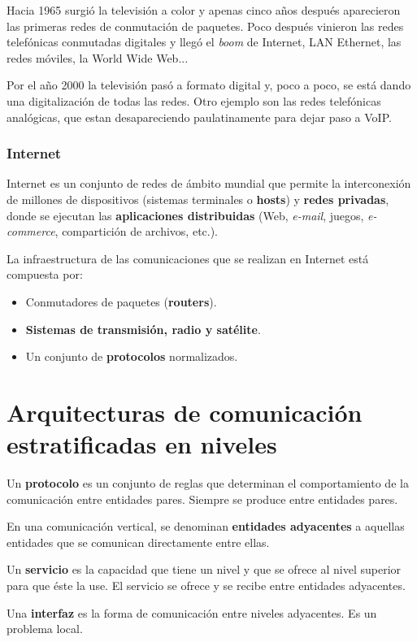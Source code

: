 \documentclass[a4paper]{book}
\begin{document}
Hacia 1965 surgió la televisión a color y apenas cinco años después aparecieron las primeras redes de conmutación de paquetes. Poco después vinieron las redes telefónicas conmutadas digitales y llegó el \textsl{boom} de Internet, LAN Ethernet, las redes móviles, la World Wide Web...

Por el año 2000 la televisión pasó a formato digital y, poco a poco, se está dando una digitalización de todas las redes. Otro ejemplo son las redes telefónicas analógicas, que estan desapareciendo paulatinamente para dejar paso a VoIP.

\subsection{Internet}
Internet es un conjunto de redes de ámbito mundial que permite la interconexión de millones de dispositivos (sistemas terminales o \textbf{hosts}) y \textbf{redes privadas}, donde se ejecutan las \textbf{aplicaciones distribuidas} (Web, \textsl{e-mail}, juegos, \textsl{e-commerce}, compartición de archivos, etc.).

La infraestructura de las comunicaciones que se realizan en Internet está compuesta por:
\begin{itemize}
  \item Conmutadores de paquetes (\textbf{routers}).
  \item \textbf{Sistemas de transmisión, radio y satélite}.
  \item Un conjunto de \textbf{protocolos} normalizados.
\end{itemize}

\chapter{Arquitecturas de comunicación estratificadas en niveles}


Un \textbf{protocolo} es un conjunto de reglas que determinan el comportamiento de la comunicación entre entidades pares. Siempre se produce entre entidades pares.

En una comunicación vertical, se denominan \textbf{entidades adyacentes} a aquellas entidades que se comunican directamente entre ellas.

Un \textbf{servicio} es la capacidad que tiene un nivel y que se ofrece al nivel superior para que éste la use. El servicio se ofrece y se recibe entre entidades adyacentes.

Una \textbf{interfaz} es la forma de comunicación entre niveles adyacentes. Es un problema local.
\end{document}
